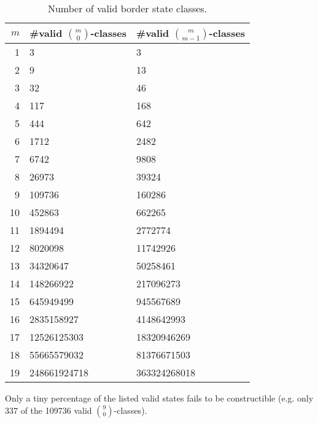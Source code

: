 \documentclass{article}
\begin{document}
\begin{table}
\begin{center}
\begin{tabular}{|r|l|l|}
\hline
$m$ & \#valid $\binom{m}{0}$-classes & \#valid $\binom{m}{m-1}$-classes \\ \hline
1   & 3 & 3 \\
2   & 9 & 13 \\
3   & 32 & 46 \\
4   & 117 & 168 \\
5   & 444 & 642 \\
6   & 1712 & 2482 \\
7   & 6742 & 9808 \\
8   & 26973 & 39324 \\
9   & 109736 & 160286 \\
10  & 452863 & 662265 \\
11  & 1894494 & 2772774 \\
12  & 8020098 & 11742926 \\
13  & 34320647 & 50258461 \\
14  & 148266922 & 217096273 \\
15  & 645949499 & 945567689 \\
16  & 2835158927 & 4148642993 \\
17  & 12526125303 & 18320946269 \\
18  & 55665579032 & 81376671503 \\
19  & 248661924718 & 363324268018 \\
\hline
\end{tabular}
\end{center}
\caption{Number of valid border state classes.}
\label{borderstates}
\end{table}

Only a tiny percentage of the listed valid states fails to be constructible
(e.g. only 337 of the 109736 valid $\binom{9}{0}$-classes).
\end{document}

